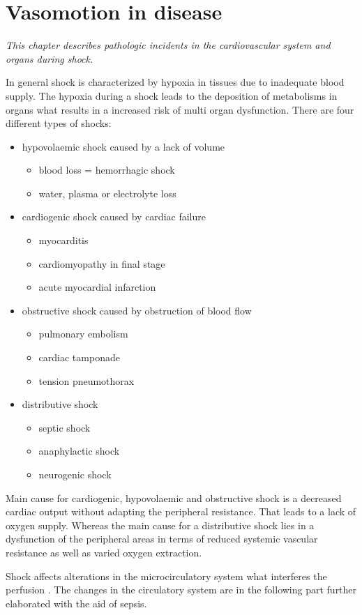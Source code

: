 \chapter{Vasomotion in disease}
\textit{This chapter describes pathologic incidents in the cardiovascular system and organs during shock.}

In general shock is characterized by hypoxia in tissues due to inadequate blood supply. The hypoxia during a shock leads to the deposition of metabolisms in organs what results in a increased risk of multi organ dysfunction. 
There are four different types of shocks: \cite{lauridsen2015,vincent2013}
\begin{itemize}
	\item hypovolaemic shock caused by a lack of volume
	\begin{itemize}
		\item blood loss = hemorrhagic shock
		\item water, plasma or electrolyte loss
	\end{itemize}
	\item cardiogenic shock caused by cardiac failure
	\begin{itemize}
		\item myocarditis
		\item cardiomyopathy in final stage
		\item acute myocardial infarction
	\end{itemize}
	\item obstructive shock caused by obstruction of blood flow
	\begin{itemize}
		\item pulmonary embolism
		\item cardiac tamponade
		\item tension pneumothorax
	\end{itemize} 
	\item distributive shock
	\begin{itemize}
		\item septic shock
		\item anaphylactic shock
		\item neurogenic shock
	\end{itemize}
\end{itemize}

Main cause for cardiogenic, hypovolaemic and obstructive shock is a decreased cardiac output without adapting the peripheral resistance. That leads to a lack of oxygen supply.
Whereas the main cause for a distributive shock lies in a dysfunction of the peripheral areas in terms of reduced systemic vascular resistance as well as varied oxygen extraction. \cite{vincent2013}

Shock affects alterations in the microcirculatory system what interferes the perfusion \cite{maier2013}. The changes in the circulatory system are in the following part further elaborated with the aid of sepsis.
